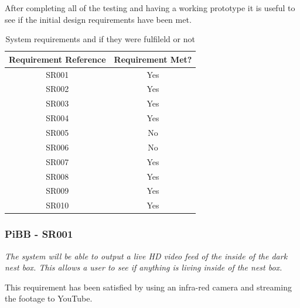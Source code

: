 \documentclass[10pt,a4paper]{article}
\begin{document}
After completing all of the testing and having a working prototype it is useful to see if the initial design requirements have been met.
\begin{table}[]
\centering
\begin{tabular}{@{}cc@{}}
\toprule
\multicolumn{1}{l}{\textbf{Requirement Reference}} & \multicolumn{1}{l}{\textbf{Requirement Met?}} \\ \midrule
SR001                                              & Yes                                           \\
SR002                                              & Yes                                           \\
SR003                                              & Yes                                           \\
SR004                                              & Yes                                           \\
SR005                                              & No                                            \\
SR006                                              & No                                            \\
SR007                                              & Yes                                           \\
SR008                                              & Yes                                           \\
SR009                                              & Yes                                           \\
SR010                                              & Yes                                           \\ \bottomrule
\end{tabular}
\caption{System requirements and if they were fulfileld or not}
\label{tab:systemRequirements}

\end{table}

\subsubsection{PiBB - SR001}
\begin{center}
\textit{The system will be able to output a live HD video feed of the inside of the dark nest box. This allows a user to see if anything is living inside of the nest box.}
\linebreak
\end{center}
This requirement has been satisfied by using an infra-red camera and streaming the footage to YouTube. 
\end{document}
